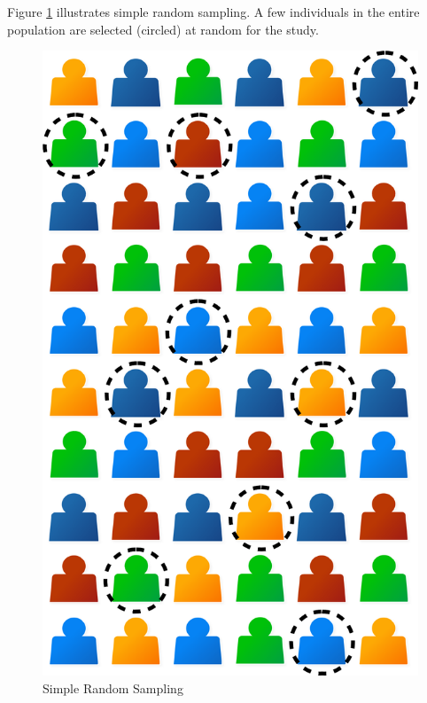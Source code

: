 Figure \ref{07:fig02} illustrates simple random sampling. A few individuals in the entire population are selected (circled) at random for the study.

\begin{figure}[H]
	\centering
	\includegraphics[width=\maxwidth{.35\linewidth}]{gfx/07-02}
	\caption{Simple Random Sampling}
	\label{07:fig02}
\end{figure}

